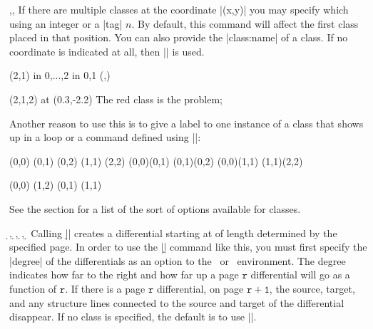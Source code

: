 \begin{sseqdata}[name = basic, cohomological Serre grading]
\begin{commandlist}{{\classoptions\moptions{}},\classoptions\moptions{}, \classoptions\moptions}
If there are multiple classes at the coordinate |(x,y)| you may specify which using an integer or a |tag| $n$. By default, this command will affect the first class placed in that position. You can also provide the |class:name| of a class. If no coordinate is indicated at all, then |\lastclass| is used.
\begin{codeexample}[width = 6cm]
\begin{sseqdata}[ name = class options example,
                  classes = fill ]
\class(2,1)
\foreach \x in {0,...,2} \foreach \y in {0,1} {
    \class(\x,\y)
}
\end{sseqdata}
\begin{sseqpage}[ name = class options example,
                  right clip padding = 0.6cm ]
\classoptions[red](2,1,2) %
\node[ background, text width = 10em ] at (0.3,-2.2)
    {\textup{The red class is the problem}};
\end{sseqpage}
\end{codeexample}
Another reason to use this is to give a label to one instance of a class that shows up in a loop or a command defined using |\NewSseqGroup|:
\begin{codeexample}[width = 6cm]
\NewSseqGroup\mygroup {} {
    \class(0,0)
    \class(0,1)
    \class(0,2)
    \class(1,1)
    \class(2,2)
    \structline(0,0)(0,1)
    \structline(0,1)(0,2)
    \structline(0,0)(1,1)
    \structline(1,1)(2,2)
}
\begin{sseqpage}[ classes = fill, class labels = { left = 0.3em } ]
\mygroup(0,0)
\mygroup(1,2)
\classoptions["2"](0,1)
\classoptions["\eta"](1,1)
\end{sseqpage}
\end{codeexample}
See the  section for a list of the sort of options available for classes.
\end{commandlist}

\begin{commandlist}{
    {\d\ooptions{}},
    {\d\ooptions{}},
    {\d\ooptions{}\pars{\sourcename\opt{,\targetn}}},
    {\d\ooptions{}\pars{\sourcecoord}\pars{\targetcoord}}%
}
Calling |\d{}| creates a differential starting at  of length determined by the specified page. In order to use the |\d| command like this, you must first specify the |degree| of the differentials as an option to the \sseqdataenv\  or \sseqpageenv\  environment. The degree indicates how far to the right and how far up a page $\mathtt{r}$ differential will go as a function of $\mathtt{r}$. If there is a page $\mathtt{r}$ differential, on page $\mathtt{r+1}$, the source, target, and any structure lines connected to the source and target of the differential disappear. If no class is specified, the default is to use |\lastclass|.


\end{commandlist}
\end{sseqdata}
